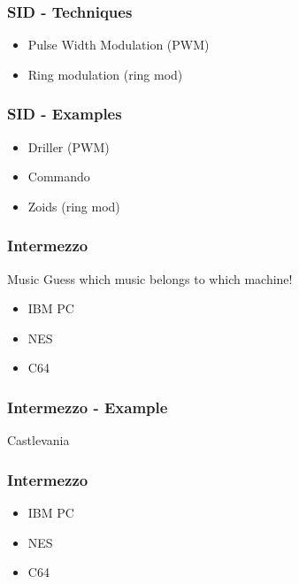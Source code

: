 
\begin{frame}
\frametitle{SID - Techniques}

\begin{itemize}
\item Pulse Width Modulation (PWM)
\item Ring modulation (ring mod)
\end{itemize}

\end{frame}


\begin{frame}
\frametitle{SID - Examples}

\begin{itemize}
\item Driller (PWM)
\item Commando
\item Zoids (ring mod)
\end{itemize}

\end{frame}


\begin{frame}
\frametitle{Intermezzo}

\begin{block}{Music}
Guess which music belongs to which machine!
\end{block}

\begin{itemize}
\item IBM PC
\item NES
\item C64
\end{itemize}

\end{frame}


\begin{frame}
\frametitle{Intermezzo - Example}

Castlevania

\end{frame}


\begin{frame}
\frametitle{Intermezzo}

\begin{itemize}
\item IBM PC
\item NES
\item C64
\end{itemize}

\end{frame}

